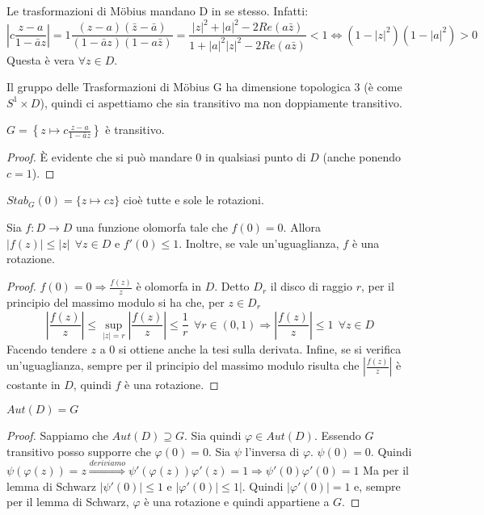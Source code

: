 \begin{osservazione}
Le trasformazioni di Möbius mandano D in se stesso. Infatti: 
$$\left|c \frac{z-a}{1- \bar{a}z} \right|= 1 \frac{(z-a)(\bar{z}-\bar{a})}{(1- \bar{a}z)({1- a\bar{z}})}=
\frac{|z|^2 + |a|^2 - 2Re(a \bar{z})}{1+ |a|^2 |z|^2 - 2Re(a \bar{z})} <1
\Longleftrightarrow \left( 1-|z|^2 \right) \left( 1-|a|^2 \right) >0$$
Questa è vera $\forall z \in D$.
\end{osservazione}

\begin{osservazione}
Il gruppo delle Trasformazioni di Möbius G ha dimensione topologica 3 (è come $S^1 \times D$),
quindi ci aspettiamo che sia transitivo ma non doppiamente transitivo.
\end{osservazione}

\begin{lemma}
$G= \left \{ z \mapsto \displaystyle{c \frac{z-a}{1- \bar{a}z}} \right \}$ è transitivo.
\end{lemma}
\begin{proof}
È evidente che si può mandare $0$ in qualsiasi punto di $D$ (anche ponendo $c=1$).
\end{proof}

\begin{osservazione}
$Stab_G (0) = \{z \mapsto cz \}$ cioè tutte e sole le rotazioni.
\end{osservazione}

\begin{lemma}[di Schwarz]
Sia $f:D\rightarrow D$ una funzione olomorfa tale che $f(0)=0$. 
Allora $|f(z)| \leq |z|\ \ \forall z \in D$ e $f'(0) \leq 1$. Inoltre, se vale un'uguaglianza, $f$ è una rotazione.
\end{lemma}
\begin{proof}
$f(0)=0 \Rightarrow \frac{f(z)}{z}$ è olomorfa in $D$. Detto $D_r$ il disco di raggio $r$,
per il principio del massimo modulo si ha che, per $z \in D_r$
$$\left| \frac{f(z)}{z} \right| \leq \sup_{|z|=r} \left| \frac{f(z)}{z} \right| \leq \frac{1}{r} \ \  \forall r \in (0,1)
\Longrightarrow \left| \frac{f(z)}{z} \right| \leq 1 \ \ \forall z \in D$$
Facendo tendere $z$ a $0$ si ottiene anche la tesi sulla derivata.
Infine, se si verifica un'uguaglianza, sempre per il principio del massimo modulo risulta che
$\left| \frac{f(z)}{z} \right|$ è costante in $D$, quindi $f$ è una rotazione.
\end{proof}

\begin{proposizione}
$Aut(D)=G$
\end{proposizione}
\begin{proof}
Sappiamo che $Aut(D) \supseteq G$. Sia quindi $\varphi \in Aut(D)$. Essendo $G$ transitivo posso supporre che $\varphi(0)=0$.
Sia $\psi$ l'inversa di $\varphi$. $\psi (0)=0$. Quindi
$\psi (\varphi (z))=z \stackrel{deriviamo}{\Longrightarrow} \psi ' (\varphi (z)) \varphi '(z) =1 \Rightarrow \psi'(0) \varphi'(0) =1$
Ma per il lemma di Schwarz $|\psi'(0)| \leq 1$ e $|\varphi'(0)| \leq 1|$. Quindi $|\varphi'(0)|=1$ e, sempre per il lemma di Schwarz,
$\varphi$ è una rotazione e quindi appartiene a $G$. 
\end{proof}

